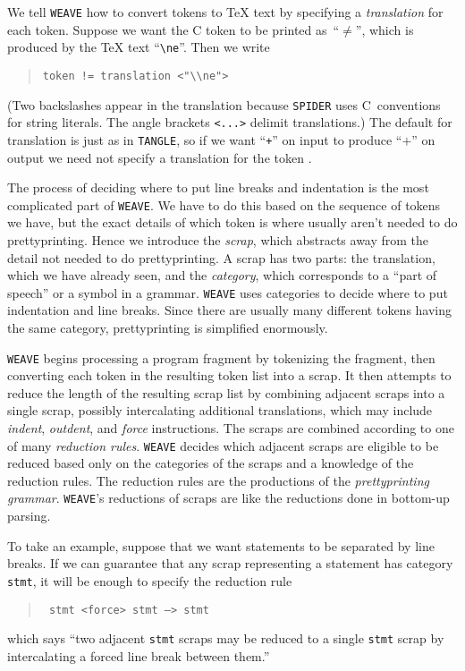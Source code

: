 We tell {\tt WEAVE} how to convert tokens to {\TeX} text by specifying
a {\em translation} for each token.
Suppose we want the C token \token{!=} to be printed as~``$\ne$'',
which is produced by the {\TeX} text ``\verb+\ne+''.
Then we write
\begin{quote}
\begin{verbatim}
token != translation <"\\ne">
\end{verbatim} 
\end{quote}
(Two backslashes appear in the translation because {\tt SPIDER} uses
C~conventions for string literals.
The angle brackets {\tt <...>}  delimit translations.)
The default for translation is just as in {\tt TANGLE}, so if we want
``{\tt +}'' on input to produce ``$+$'' on output we need not specify a
translation for the token \token{+}.

The process of deciding where to put line breaks and indentation is
the most complicated part of {\tt WEAVE}.
We have to do this based on the sequence of tokens we have, but the
exact details of which token is where usually aren't needed to do
prettyprinting.
Hence we introduce the {\em scrap}, which abstracts away from the
detail not needed to do prettyprinting.
A scrap has two parts: the translation, which we have already seen,
and the {\em category}, which
 corresponds to a ``part of speech'' or a symbol in a grammar. 
{\tt WEAVE} uses categories to decide where to put
indentation and line breaks.
Since there are usually many different tokens having the same category,
prettyprinting is simplified enormously.

{\tt WEAVE} begins processing a program fragment by tokenizing the
fragment, then converting each token in the resulting token list into
a scrap. 
It then attempts to reduce the length of the resulting scrap list by
combining adjacent scraps into a single scrap, possibly intercalating
additional translations, which may include
{\em indent}, {\em outdent}, and {\em force} instructions.
The scraps are combined according to one of many {\em reduction rules}.
{\tt WEAVE} decides which adjacent scraps are eligible to be reduced
based only on the categories of the scraps and a knowledge of the
reduction rules.
The reduction rules are the productions of the {\em prettyprinting
grammar}. 
{\tt WEAVE}'s reductions of scraps are like the reductions done in
bottom-up parsing. 

To take an example, suppose that we want statements to be separated by
line breaks.
If we can guarantee that any scrap representing a statement has
category {\tt stmt}, it will be enough to specify the reduction rule
\begin{quote}\tt
stmt <force> stmt --> stmt
\end{quote}
which says ``two adjacent {\tt stmt} scraps may be reduced to a single
{\tt stmt} scrap by intercalating a forced line break between them.''

